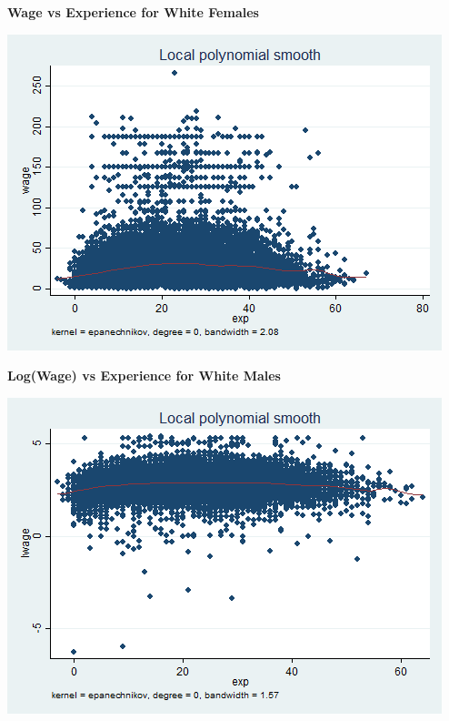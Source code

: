 \documentclass{article}
\begin{document}
\begin{center}
	\textbf{Wage vs Experience for White Females}\par\medskip
    \includegraphics[scale=.6]{../plots/q4_graph4}
\end{center}

\begin{center}
	\textbf{Log(Wage) vs Experience for White Males}\par\medskip
    \includegraphics[scale=.6]{../plots/q4_graph5}
\end{center}
\end{document}
